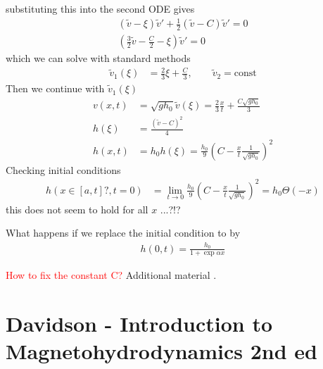 \documentclass[../main.tex]{subfiles}
\begin{document}
substituting this into the second ODE gives
\begin{align}
(\tilde{v}-\xi)\tilde{v}'+\frac{1}{2}(\tilde{v}-C)\tilde{v}'=0\\
\left(\frac{3}{2}\tilde{v}-\frac{C}{2}-\xi\right)\tilde{v}'=0
\end{align}
which we can solve with standard methods
\begin{align}
\tilde{v}_1(\xi)&=\frac{2}{3}\xi+\frac{C}{3},\qquad\tilde{v}_2=\text{const}
\end{align}
Then we continue with $\tilde{v}_1(\xi)$
\begin{align}
v(x,t)&=\sqrt{gh_0}\tilde{v}(\xi)=\frac{2}{3}\frac{x}{t}+\frac{C\sqrt{gh_0}}{3}\\
h(\xi)&=\frac{(\tilde{v}-C)^2}{4}\\
h(x,t)&=h_0h(\xi)=\frac{h_0}{9}\left(C-\frac{x}{t}\frac{1}{\sqrt{gh_0}}\right)^2
\end{align}
Checking initial conditions
\begin{align}
h(x\in[a,t]?,t=0)
&=\lim_{t\rightarrow0}\frac{h_0}{9}\left(C-\frac{x}{t}\frac{1}{\sqrt{gh_0}}\right)^2=h_0\Theta(-x)
\end{align}
this does not seem to hold for all $x$ ...?!?

What happens if we replace the initial condition to by
\begin{align}
h(0,t)=\frac{h_0}{1+\exp{\alpha x}}
\end{align}


\textcolor{red}{How to fix the constant C?}
Additional material \cite{Whitham1999}.


\section{{\sc Davidson} - Introduction to Magnetohydrodynamics 2nd ed}
\end{document}
